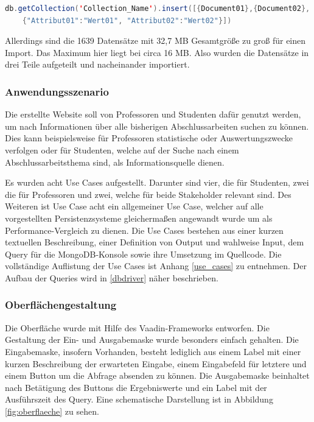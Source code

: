 \begin{lstlisting}[caption={MongoDB Importfunktion},language=java,captionpos=t,numbers=none, numberstyle=\tiny,basicstyle=\scriptsize,breaklines=true]
db.getCollection('Collection_Name').insert([{Document01},{Document02},
	{"Attribut01":"Wert01", "Attribut02":"Wert02"}])
\end{lstlisting}\label{lst:mongodb_import}

Allerdings sind die 1639 Datensätze mit 32,7 MB Gesamtgröße zu groß für einen Import. Das Maximum hier liegt bei circa 16 MB. Also wurden die Datensätze in drei Teile aufgeteilt und nacheinander importiert.

\subsubsection{Anwendungsszenario}
Die erstellte Website soll von Professoren und Studenten dafür genutzt werden, um nach Informationen über alle bisherigen Abschlussarbeiten suchen zu können. Dies kann beispielsweise für Professoren statistische oder Auswertungszwecke verfolgen oder für Studenten, welche auf der Suche nach einem Abschlussarbeitsthema sind, als Informationsquelle dienen.

Es wurden acht Use Cases aufgestellt. Darunter sind vier, die für Studenten, zwei die für Professoren und zwei, welche für beide Stakeholder relevant sind. Des Weiteren ist Use Case acht ein allgemeiner Use Case, welcher auf alle vorgestellten Persistenzsysteme gleichermaßen angewandt wurde um als Performance-Vergleich zu dienen. Die Use Cases bestehen aus einer kurzen textuellen Beschreibung, einer Definition von Output und wahlweise Input, dem Query für die MongoDB-Konsole sowie ihre Umsetzung im Quellcode. Die vollständige Auflistung der Use Cases ist Anhang \ref{use_cases} zu entnehmen. Der Aufbau der Queries wird in \ref{dbdriver} näher beschrieben. 

\subsubsection{Oberflächengestaltung}
Die Oberfläche wurde mit Hilfe des Vaadin-Frameworks entworfen. Die Gestaltung der Ein- und Ausgabemaske wurde besonders einfach gehalten. Die Eingabemaske, insofern Vorhanden, besteht lediglich aus einem Label mit einer kurzen Beschreibung der erwarteten Eingabe, einem Eingabefeld für letztere und einem Button um die Abfrage absenden zu können. Die Ausgabemaske beinhaltet nach Betätigung des Buttons die Ergebniswerte und ein Label mit der Ausführszeit des Query. Eine schematische Darstellung ist in Abbildung \ref{fig:oberflaeche} zu sehen. 

